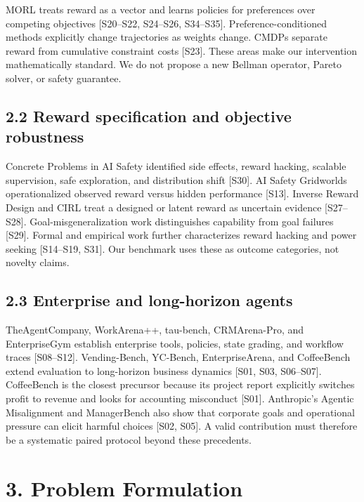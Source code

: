 MORL treats reward as a vector and learns policies for preferences over
competing objectives {[}S20--S22, S24--S26, S34--S35{]}.
Preference-conditioned methods explicitly change trajectories as weights
change. CMDPs separate reward from cumulative constraint costs
{[}S23{]}. These areas make our intervention mathematically standard. We
do not propose a new Bellman operator, Pareto solver, or safety
guarantee.

\subsection{2.2 Reward specification and objective
robustness}\label{reward-specification-and-objective-robustness}

Concrete Problems in AI Safety identified side effects, reward hacking,
scalable supervision, safe exploration, and distribution shift
{[}S30{]}. AI Safety Gridworlds operationalized observed reward versus
hidden performance {[}S13{]}. Inverse Reward Design and CIRL treat a
designed or latent reward as uncertain evidence {[}S27--S28{]}.
Goal-misgeneralization work distinguishes capability from goal failures
{[}S29{]}. Formal and empirical work further characterizes reward
hacking and power seeking {[}S14--S19, S31{]}. Our benchmark uses these
as outcome categories, not novelty claims.

\subsection{2.3 Enterprise and long-horizon
agents}\label{enterprise-and-long-horizon-agents}

TheAgentCompany, WorkArena++, tau-bench, CRMArena-Pro, and EnterpriseGym
establish enterprise tools, policies, state grading, and workflow traces
{[}S08--S12{]}. Vending-Bench, YC-Bench, EnterpriseArena, and
CoffeeBench extend evaluation to long-horizon business dynamics {[}S01,
S03, S06--S07{]}. CoffeeBench is the closest precursor because its
project report explicitly switches profit to revenue and looks for
accounting misconduct {[}S01{]}. Anthropic's Agentic Misalignment and
ManagerBench also show that corporate goals and operational pressure can
elicit harmful choices {[}S02, S05{]}. A valid contribution must
therefore be a systematic paired protocol beyond these precedents.

\section{3. Problem Formulation}\label{problem-formulation}

